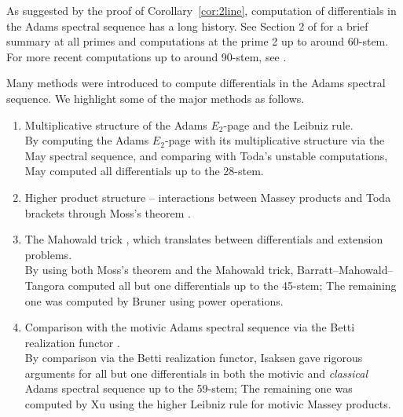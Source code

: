 \documentclass{amsart}
\numberwithin{equation}{section}
\begin{document}
As suggested by the proof of Corollary~\ref{cor:2line}, computation of differentials in the Adams spectral sequence has a long history. See Section 2 of \cite{WX61} for a brief summary at all primes and computations at the prime 2 up to around 60-stem. For more recent computations up to around 90-stem, see \cite{IWX, IWXsurvey, WXems, WXicm}.

Many methods were introduced to compute differentials in the Adams spectral sequence. We highlight some of the major methods as follows.
\begin{enumerate}
    \item Multiplicative structure of the Adams $E_2$-page and the Leibniz rule. \\
    
     \noindent By computing the Adams $E_2$-page with its multiplicative structure via the May spectral sequence, and comparing with Toda's unstable computations, May \cite{Maythesis} computed all differentials up to the 28-stem.\\
    
    \item Higher product structure -- interactions between Massey products and Toda brackets through Moss's theorem \cite{Moss}.\\

    \item The Mahowald trick \cite{MahowaldTangora}, which translates between differentials and extension problems.\\

    \noindent By using both Moss's theorem and the Mahowald trick, Barratt--Mahowald--Tangora \cite{MahowaldTangora, BarrattMahowaldTangora} computed all but one differentials up to the 45-stem; The remaining one was computed by Bruner \cite{Brunerdiff} using power operations.\\

    \item Comparison with the motivic Adams spectral sequence via the Betti realization functor \cite{DuggerIsaksen}.\\

    \noindent By comparison via the Betti realization functor, Isaksen \cite{Isaksen} gave rigorous arguments for all but one differentials in both the motivic and \emph{classical} Adams spectral sequence up to the 59-stem; The remaining one was computed by Xu \cite{IsaksenXu} using the higher Leibniz rule for motivic Massey products. \\


\end{enumerate}
\end{document}
